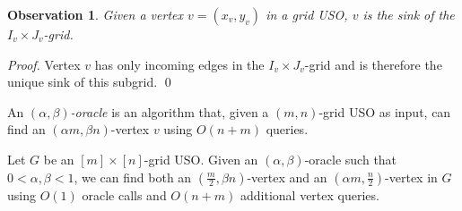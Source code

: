 \documentclass[runningheads,a4paper]{llncs}
\newtheorem{observation}{Observation}
\begin{document}
\begin{observation}\label{Obs:Sink of dominated grid}
Given a vertex  $v = (x_v, y_v)$ in a grid USO, $v$ is the sink of the $I_v\times J_v$-grid.
\end{observation}
\begin{proof}
Vertex $v$ has only incoming edges in the $I_v\times J_v$-grid and is therefore the unique sink of this subgrid. \qed
\end{proof}

An \emph{$(\alpha, \beta)$-oracle} is an algorithm that, given a $(m, n)$-grid USO as input, can find an $(\alpha m, \beta n)$-vertex $v$ using $O(n + m)$ queries.

\begin{lemma}\label{lemma:Climbing lemma}
Let $G$ be an $[m]\times [n]$-grid USO.
Given an $(\alpha, \beta)$-oracle such that $0 < \alpha, \beta  < 1$, we can find both an $(\frac{m}{2}, \beta n)$-vertex and an $(\alpha m, \frac{n}{2})$-vertex in $G$ using $O(1)$ oracle calls and $O(n+m)$ additional vertex queries.
\end{lemma}
\end{document}
